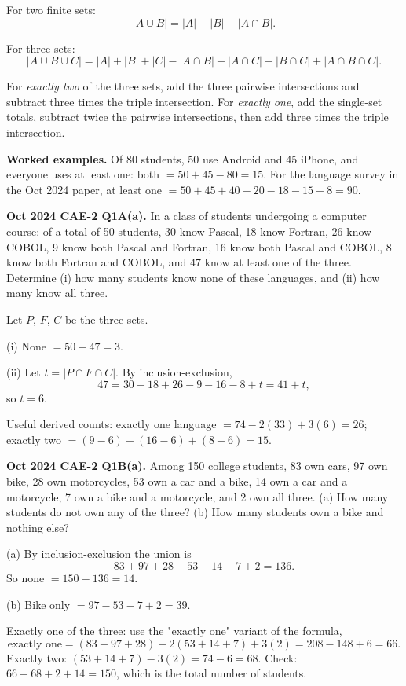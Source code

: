 \documentclass[11pt,a4paper]{article}
\begin{document}
For two finite sets:
\[
|A\cup B|=|A|+|B|-|A\cap B|.
\]

For three sets:
\[
|A\cup B\cup C|=|A|+|B|+|C|-|A\cap B|-|A\cap C|-|B\cap C|+|A\cap B\cap C|.
\]

For \emph{exactly two} of the three sets, add the three pairwise intersections and subtract three times the triple intersection. For \emph{exactly one}, add the single-set totals, subtract twice the pairwise intersections, then add three times the triple intersection.

\begin{exambox}
\textbf{Worked examples.} Of 80 students, 50 use Android and 45 iPhone, and everyone uses at least one: both $=50+45-80=15$. For the language survey in the Oct 2024 paper, at least one $=50+45+40-20-18-15+8=90$.
\end{exambox}

\begin{pyqbox}
\textbf{Oct 2024 CAE-2 Q1A(a).} In a class of students undergoing a computer course: of a total of 50 students, 30 know Pascal, 18 know Fortran, 26 know COBOL, 9 know both Pascal and Fortran, 16 know both Pascal and COBOL, 8 know both Fortran and COBOL, and 47 know at least one of the three. Determine (i) how many students know none of these languages, and (ii) how many know all three.
\end{pyqbox}

\begin{solbox}
Let $P$, $F$, $C$ be the three sets.

(i) None $=50-47=\boxed{3}$.

(ii) Let $t=|P\cap F\cap C|$. By inclusion-exclusion,
\[
47=30+18+26-9-16-8+t=41+t,
\]
so $t=\boxed{6}$.

Useful derived counts: exactly one language $=74-2(33)+3(6)=26$; exactly two $=(9-6)+(16-6)+(8-6)=15$.
\end{solbox}

\begin{pyqbox}
\textbf{Oct 2024 CAE-2 Q1B(a).} Among 150 college students, 83 own cars, 97 own bike, 28 own motorcycles, 53 own a car and a bike, 14 own a car and a motorcycle, 7 own a bike and a motorcycle, and 2 own all three. (a) How many students do not own any of the three? (b) How many students own a bike and nothing else?
\end{pyqbox}

\begin{solbox}
(a) By inclusion-exclusion the union is
\[
83+97+28-53-14-7+2=136.
\]
So none $=150-136=\boxed{14}$.

(b) Bike only $=97-53-7+2=\boxed{39}$.

Exactly one of the three: use the "exactly one" variant of the formula,
\[
\text{exactly one}=(83+97+28)-2(53+14+7)+3(2)=208-148+6=66.
\]
Exactly two: $(53+14+7)-3(2)=74-6=68$.
Check: $66+68+2+14=150$, which is the total number of students.
\end{solbox}
\end{document}
